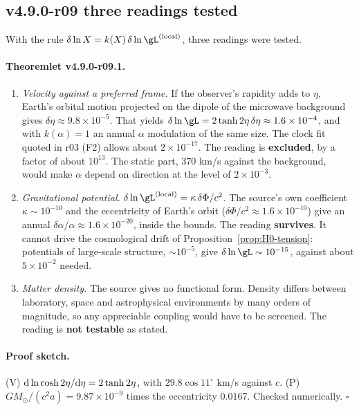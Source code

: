 \subsection*{v4.9.0-r09 three readings tested}
\label{subsec:v490-r09-readings}

With the rule \(\delta\ln X=k(X)\,\delta\ln\gL^{(\mathrm{local})}\), three readings were tested.

\paragraph{Theoremlet v4.9.0-r09.1.}
\begin{enumerate}[leftmargin=2em]
\item[(V)] \emph{Velocity against a preferred frame.}  If the observer's rapidity adds to \(\eta\), Earth's orbital motion
projected on the dipole of the microwave background gives \(\delta\eta\approx9.8\times10^{-5}\).  That yields
\(\delta\ln\gL=2\tanh2\eta\,\delta\eta\approx1.6\times10^{-4}\), and with \(k(\alpha)=1\) an annual \(\alpha\) modulation of the
same size.  The clock fit quoted in r03 (F2) allows about \(2\times10^{-17}\).  The reading is \textbf{excluded}, by a factor
of about \(10^{13}\).  The static part, \(370\) km/s against the background, would make \(\alpha\) depend on direction at the
level of \(2\times10^{-3}\).
\item[(P)] \emph{Gravitational potential.}  \(\delta\ln\gL^{(\mathrm{local})}=\kappa\,\delta\Phi/c^2\).  The source's own
coefficient \(\kappa\sim10^{-10}\) and the eccentricity of Earth's orbit (\(\delta\Phi/c^2\approx1.6\times10^{-10}\)) give an
annual \(\delta\alpha/\alpha\approx1.6\times10^{-20}\), inside the bounds.  The reading \textbf{survives}.  It cannot drive the
cosmological drift of Proposition~\ref{prop:H0-tension}: potentials of large-scale structure, \(\sim10^{-5}\), give
\(\delta\ln\gL\sim10^{-15}\), against about \(5\times10^{-2}\) needed.
\item[(D)] \emph{Matter density.}  The source gives no functional form.  Density differs between laboratory, space and
astrophysical environments by many orders of magnitude, so any appreciable coupling would have to be screened.  The
reading is \textbf{not testable} as stated.
\end{enumerate}

\paragraph{Proof sketch.}
(V) \({\rm d}\ln\cosh2\eta/{\rm d}\eta=2\tanh2\eta\), with \(29.8\cos11^\circ\) km/s against \(c\).  (P) \(GM_\odot/(c^2a)=9.87\times
10^{-9}\) times the eccentricity \(0.0167\).  Checked numerically.  \(\square\)

